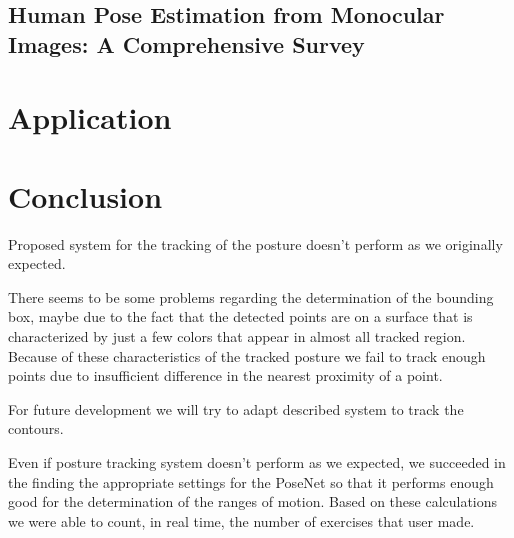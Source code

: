 \documentclass[runningheads,a4paper,11pt]{report}
\begin{document}
\section{Human Pose Estimation from Monocular Images: A Comprehensive Survey
\cite{humanmonocular}}




\chapter{Application}
\chapter{Conclusion}
\par Proposed system for the tracking of the posture doesn\mbox{'}t perform as we originally expected.
\par There seems to be some problems regarding the determination of the bounding box, maybe due to the fact that the detected points are on a surface that is characterized by just a few colors that appear in almost all tracked region. Because of these characteristics of the tracked posture we fail to track enough points due to insufficient difference in the nearest proximity of a point. 

\par For future development we will try to adapt described system to track the contours.

Even if posture tracking system doesn\mbox{'}t perform as we expected, we succeeded in the finding the appropriate settings for the PoseNet so that it performs enough good for the determination of the ranges of motion. Based on these calculations we were able to count, in real time, the number of exercises that user made.




\end{document}
